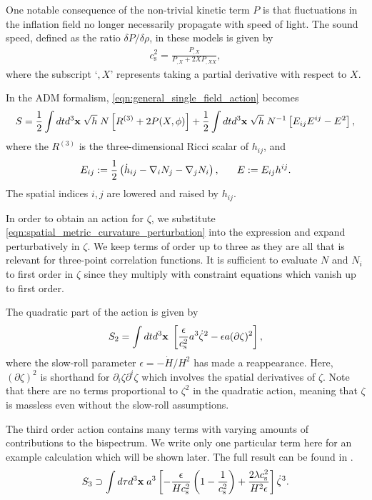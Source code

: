One notable consequence of the non-trivial kinetic term $P$ is that fluctuations in the inflation field no longer necessarily propagate with speed of light. The sound speed, defined as the ratio $\delta P / \delta \rho$, in these models is given by
\begin{align}
	c_\text{s}^2 = \frac{P_{,X}}{P_{,X} + 2 X P_{,XX}}, \label{eqn:general_single_field_sound_speed}
\end{align}
where the subscript `$,X$' represents taking a partial derivative with respect to $X$.

In the ADM formalism, \eqref{eqn:general_single_field_action} becomes
\begin{align}
	S = \frac{1}{2}\int dt d^3 \mathbf{x} \; \sqrt{h} \; N \left[ R^{(3)} + 2P(X,\phi) \right] + \frac{1}{2} \int dt d^3 \mathbf{x} \; \sqrt{h} \; N^{-1} \left[ E_{ij} E^{ij} - E^2 \right],
\end{align}
where the $R^{(3)}$ is the three-dimensional Ricci scalar of $h_{ij}$, and
\begin{align}
	E_{ij} := \frac{1}{2} \left( \dot{h}_{ij} - \nabla_i N_j - \nabla_j N_i \right), \hspace{0.05\textwidth}
	E := E_{ij} h^{ij}.
\end{align}
The spatial indices $i,j$ are lowered and raised by $h_{ij}$.

In order to obtain an action for $\zeta$, we substitute \eqref{eqn:spatial_metric_curvature_perturbation} into the expression and expand perturbatively in $\zeta$. We keep terms of order up to three as they are all that is relevant for three-point correlation functions. It is sufficient to evaluate $N$ and $N_i$ to first order in $\zeta$ since they multiply with constraint equations which vanish up to first order.

The quadratic part of the action is given by
\begin{align}
	S_2 = \int dt d^3\mathbf{x} \; \left[ \frac{\epsilon}{c_\text{s}^2} a^3 \dot{\zeta}^2 - \epsilon a(\partial\zeta)^2  \right], \label{eqn:quadratic_action_in_zeta}
\end{align}
where the slow-roll parameter $\epsilon=-\dot{H}/H^2$ has made a reappearance. Here, $(\partial\zeta)^2$ is shorthand for $\partial_i \zeta \partial^i \zeta$ which involves the spatial derivatives of $\zeta$. Note that there are no terms proportional to $\zeta^2$ in the quadratic action, meaning that $\zeta$ is massless even without the slow-roll assumptions.

The third order action contains many terms with varying amounts of contributions to the bispectrum. We write only one particular term here for an example calculation which will be shown later. The full result can be found in \cite{Chen2007b}. 
\begin{align}
	S_3 \supset \int d\tau d^3\mathbf{x} \; a^3 \left[ -\frac{\epsilon}{H c_\text{s}^2} \left( 1 - \frac{1}{c_\text{s}^2} \right) + \frac{2\lambda c_\text{s}^2}{H^2 \epsilon} \right] \dot{\zeta}^3.	 \label{eqn:cubic_action_example_term}
\end{align}

